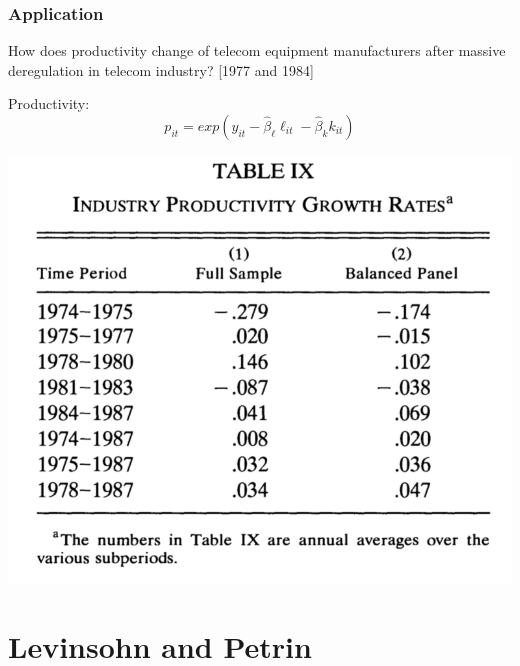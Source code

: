 \documentclass[11pt, aspectratio=169]{beamer}
\newenvironment{wideitemize}{\itemize\addtolength{\itemsep}{10pt}}{\enditemize}
\begin{document}
\begin{frame}[c]\frametitle{Application}
    

\begin{wideitemize}
	\item How does productivity change of telecom equipment manufacturers after massive deregulation in telecom industry? [1977 and 1984]
	\item Productivity:
	$$p_{it} = exp(y_{it} - \hat{\beta}_{\ell}\ell_{it} - \hat{\beta}_{k}k_{it} )$$
\end{wideitemize}

\centering
\includegraphics[scale=.2]{OP-Table9.png}

\end{frame}




\section[LP]{Levinsohn and Petrin} %
\label{sec:levinsohn_and_petrin}
\end{document}
